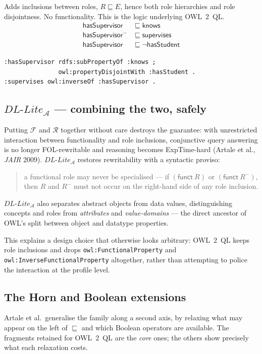 \documentclass[11pt,a4paper]{article}
\newcommand{\dllite}[1]{\ensuremath{\textit{DL-Lite}_{#1}}}
\newcommand{\rn}[1]{\mathsf{#1}}      %
\newcommand{\sub}{\sqsubseteq}
\newcommand{\inv}[1]{#1^{-}}
\begin{document}
Adds inclusions between roles, $R \sub E$, hence both role hierarchies and role
disjointness. No functionality. This is the logic underlying OWL~2~QL.
\begin{align*}
  \rn{hasSupervisor} &\sub \rn{knows}\\
  \inv{\rn{hasSupervisor}} &\sub \rn{supervises}\\
  \rn{hasSupervisor} &\sub \neg\rn{hasStudent}
\end{align*}
\begin{lstlisting}
:hasSupervisor rdfs:subPropertyOf :knows ;
               owl:propertyDisjointWith :hasStudent .
:supervises owl:inverseOf :hasSupervisor .
\end{lstlisting}

\subsection*{$\dllite{\mathcal{A}}$ --- combining the two, safely}

Putting $\mathcal{F}$ and $\mathcal{R}$ together without care destroys the
guarantee: with unrestricted interaction between functionality and role
inclusions, conjunctive query answering is no longer FOL-rewritable and
reasoning becomes ExpTime-hard (Artale et al., \emph{JAIR} 2009).
$\dllite{\mathcal{A}}$ restores rewritability with a syntactic proviso:
\begin{quote}
  a functional role may never be specialised --- if $(\mathsf{funct}\ R)$ or
  $(\mathsf{funct}\ \inv{R})$, then $R$ and $\inv{R}$ must not occur on the
  right-hand side of any role inclusion.
\end{quote}
$\dllite{\mathcal{A}}$ also separates abstract objects from data values,
distinguishing concepts and roles from \emph{attributes} and
\emph{value-domains} --- the direct ancestor of OWL's split between object and
datatype properties.

This explains a design choice that otherwise looks arbitrary: OWL~2~QL keeps
role inclusions and drops \texttt{owl:Functional\-Property} and
\texttt{owl:Inverse\-Functional\-Property} altogether, rather than attempting to
police the interaction at the profile level.

\subsection*{The Horn and Boolean extensions}

Artale et al.\ generalise the family along a second axis, by relaxing what may
appear on the left of $\sub$ and which Boolean operators are available. The
fragments retained for OWL~2~QL are the \emph{core} ones; the others show
precisely what each relaxation costs.
\end{document}
